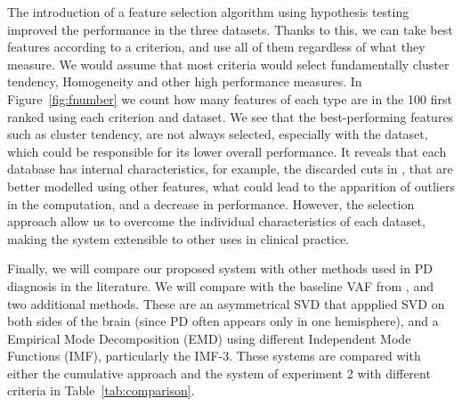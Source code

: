 The introduction of a feature selection algorithm using hypothesis testing improved the performance in the three datasets. Thanks to this, we can take best features according to a criterion, and use all of them regardless of what they measure. We would assume that most criteria would select fundamentally cluster tendency, Homogeneity and other high performance measures. In Figure~\ref{fig:fnumber} we count how many features of each type are in the 100 first ranked using each criterion and dataset. We see that the best-performing features such as cluster tendency, are not always selected, especially with the \vdlndat{} dataset, which could be responsible for its lower overall performance. It reveals that each database has internal characteristics, for example, the discarded cuts in \vdlndat{}, that are better modelled using other features, what could lead to the apparition of outliers in the computation, and a decrease in performance. However, the selection approach allow us to overcome the individual characteristics of each dataset, making the system extensible to other uses in clinical practice. 

Finally, we will compare our proposed system with other methods used in \ac{PD} diagnosis in the literature. We will compare with the baseline \ac{VAF} from \cite{Illan2012}, and two additional methods. These are an asymmetrical \ac{SVD} \cite{Segovia2012} that appplied \ac{SVD} on both sides of the brain (since \ac{PD} often appears only in one hemisphere), and a Empirical Mode Decomposition (EMD)  \cite{Rojas2012} using different Independent Mode Functions (IMF), particularly the IMF-3. These systems are compared with either the cumulative approach and the system of experiment 2 with different criteria in Table~\ref{tab:comparison}.

